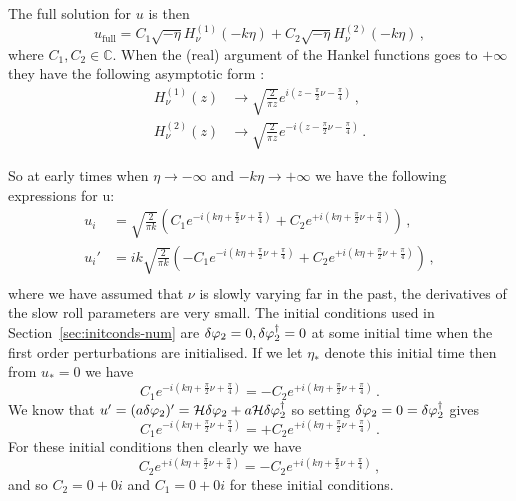 The full solution for $u$ is then
% 
\begin{equation}
 u_\mathrm{full} = C_1 \sqrt{-\eta} H_\nu^{(1)}(-k\eta) +
                   C_2 \sqrt{-\eta} H_\nu^{(2)}(-k\eta)\,,
\end{equation}
% 
where $C_1, C_2\in \mathbb{C}$. When the (real) argument of the Hankel functions goes to $+\infty$
they have the following asymptotic form \cite{abramowitz+stegun}:
% 
\begin{align}
 H_\nu^{(1)}(z) &\rightarrow \sqrt{\frac{2}{\pi z}} e^{i(z-\frac{\pi}{2}\nu - \frac{\pi}{4})} \,,\\
 H_\nu^{(2)}(z) &\rightarrow \sqrt{\frac{2}{\pi z}} e^{-i(z-\frac{\pi}{2}\nu - \frac{\pi}{4})} \,.
\end{align}
% 

So at early times when $\eta\rightarrow -\infty$ and $-k\eta\rightarrow +\infty$ we have the
following expressions for u:
% 
\begin{align}
 u_{i} &= \sqrt{\frac{2}{\pi k}}\left( C_1 e^{-i(k\eta +\frac{\pi}{2}\nu + \frac{\pi}{4})}
                + C_2 e^{+i(k\eta +\frac{\pi}{2}\nu + \frac{\pi}{4})} \right) \,,\\
 u_{i}' &= i k\sqrt{\frac{2}{\pi k}}\left( -C_1 e^{-i(k\eta +\frac{\pi}{2}\nu + \frac{\pi}{4})}
                + C_2 e^{+i(k\eta +\frac{\pi}{2}\nu + \frac{\pi}{4})} \right) \,,\\
\end{align}
% 
where we have assumed that $\nu$ is slowly varying far in the past, \iec the derivatives of the slow
roll parameters are very small. The initial conditions used in Section~\ref{sec:initconds-num} are
$\delta\varphi_{2}=0, \delta\varphi_{2}^{\dagger}=0$ at some initial time when the first order perturbations are initialised. If
we let
$\eta_*$ denote this initial time then from $u_*=0$ we have
% 
\begin{equation}
 C_1 e^{-i(k\eta +\frac{\pi}{2}\nu + \frac{\pi}{4})} = -C_2 e^{+i(k\eta +\frac{\pi}{2}\nu +
\frac{\pi}{4})}\,.
\end{equation}
% 
We know that $u'=(a\delta\varphi_{2})' = \mathcal{H} \delta\varphi_{2} + a\mathcal{H} \delta\varphi_{2}^{\dagger}$ so setting $\delta\varphi_{2}=0=\delta\varphi_{2}^{\dagger}$ gives
% 
\begin{equation}
 C_1 e^{-i(k\eta +\frac{\pi}{2}\nu + \frac{\pi}{4})} = +C_2 e^{+i(k\eta +\frac{\pi}{2}\nu +
\frac{\pi}{4})}\,.
\end{equation}
% 
For these initial conditions then clearly we have
% 
\begin{equation}
C_2 e^{+i(k\eta +\frac{\pi}{2}\nu + \frac{\pi}{4})} =
 -C_2 e^{+i(k\eta +\frac{\pi}{2}\nu + \frac{\pi}{4})} \,,
\end{equation}
% 
and so $C_2 = 0 + 0i$ and $C_1=0+0i$ for these initial conditions.

